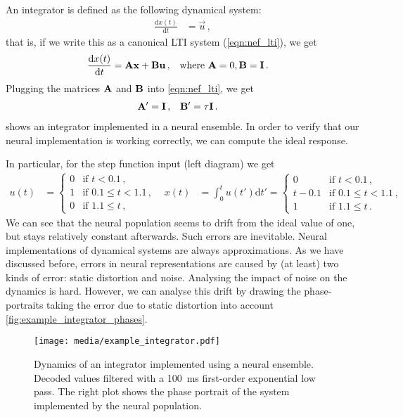 \documentclass[10pt,letterpaper,oneside]{article}
\begin{document}
An integrator is defined as the following dynamical system:
\begin{align*}
	\frac{\mathrm{d} x(t)}{\mathrm{d}t} &= \vec u \,,
\end{align*}
that is, if we write this as a canonical LTI system (\cref{eqn:nef_lti}), we get
\begin{align*}
	\frac{\mathrm{d} x(t)}{\mathrm{d}t} &= {\mathbf{A}} {\mathbf{x}} + {\mathbf{B}} {\mathbf{u}} \,, && \text{where } {\mathbf{A}} = 0, {\mathbf{B}} = {\mathbf{I}} \,.
\end{align*}
Plugging the matrices ${\mathbf{A}}$ and ${\mathbf{B}}$ into \cref{eqn:nef_lti}, we get
\begin{align*}
	{\mathbf{A}}' &= {\mathbf{I}} \,, & {\mathbf{B}}' &= \tau {\mathbf{I}} \,.
\end{align*}
 shows an integrator implemented in a neural ensemble. In order to verify that our neural implementation is working correctly, we can compute the ideal response.

In particular, for the step function input (left diagram) we get
\begin{align*}
	u(t) &= \begin{cases}
		0 & \text{if } t < 0.1 \,, \\
		1 & \text{if } 0.1 \leq t < 1.1 \,, \\
		0 & \text{if } 1.1 \leq t \,,
		\end{cases} &
	x(t) &= \int_{0}^t u(t') \mathrm{d}t' = \begin{cases}
		0 & \text{if } t < 0.1 \,, \\
		t - 0.1 & \text{if } 0.1 \leq t < 1.1 \,, \\
		1 & \text{if } 1.1 \leq t \,.
	\end{cases}
\end{align*}
We can see that the neural population seems to drift from the ideal value of one, but stays relatively constant afterwards. Such errors are inevitable. Neural implementations of dynamical systems are always approximations. As we have discussed before, errors in neural representations are caused by (at least) two kinds of error: static distortion and noise. Analysing the impact of noise on the dynamics is hard. However, we can analyse this drift by drawing the phase-portraits taking the error due to static distortion into account \cref{fig:example_integrator_phases}.

\begin{figure}
	\centering
	\texttt{[image: media/example\_integrator.pdf]}
	\caption{Dynamics of an integrator implemented using a neural ensemble. Decoded values filtered with a \SI{100}{\milli\second} first-order exponential low pass. The right plot shows the phase portrait of the system implemented by the neural population.  }
	\label{fig:example_integrator}
\end{figure}
\end{document}
